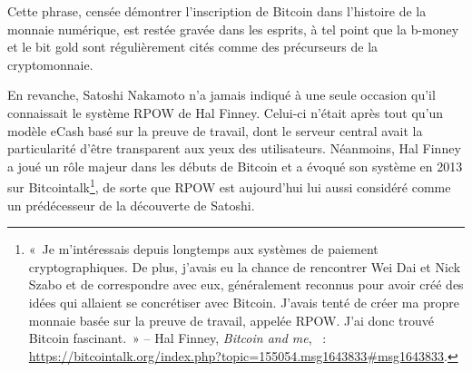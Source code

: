 Cette phrase, censée démontrer l'inscription de Bitcoin dans l'histoire de la monnaie numérique, est restée gravée dans les esprits, à tel point que la b-money et le bit gold sont régulièrement cités comme des précurseurs de la cryptomonnaie.

En revanche, Satoshi Nakamoto n'a jamais indiqué à une seule occasion qu'il connaissait le système RPOW de Hal Finney. Celui-ci n'était après tout qu'un modèle eCash basé sur la preuve de travail, dont le serveur central avait la particularité d'être transparent aux yeux des utilisateurs. Néanmoins, Hal Finney a joué un rôle majeur dans les débuts de Bitcoin et a évoqué son système en 2013 sur Bitcointalk\footnote{«~Je m'intéressais depuis longtemps aux systèmes de paiement cryptographiques. De plus, j'avais eu la chance de rencontrer Wei Dai et Nick Szabo et de correspondre avec eux, généralement reconnus pour avoir créé des idées qui allaient se concrétiser avec Bitcoin. J'avais tenté de créer ma propre monnaie basée sur la preuve de travail, appelée RPOW. J'ai donc trouvé Bitcoin fascinant.~» -- Hal Finney, \emph{Bitcoin and me}, ~: \url{https://bitcointalk.org/index.php?topic=155054.msg1643833\#msg1643833}.}, de sorte que RPOW est aujourd'hui lui aussi considéré comme un prédécesseur de la découverte de Satoshi. %

